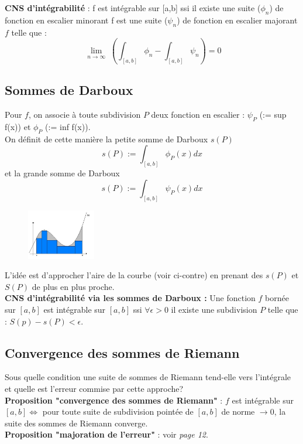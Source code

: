 \documentclass[11pt, a4paper, openany]{book}
\begin{document}
\textbf{CNS d'intégrabilité} : f est intégrable sur [a,b] ssi il existe une suite ($\phi_n$) de fonction en escalier minorant f est une suite ($\psi_n$) de fonction en escalier majorant $f$ telle que : 
$$\lim\limits_{\substack{n \to \infty}} \left(\int_{[a,b]} \phi_n - \int_{[a,b]} \psi_n \right) = 0$$

\subsection{Sommes de Darboux}
Pour $f$, on associe à toute subdivision $P$ deux fonction en escalier : $\psi_P$ (:= sup f(x)) et $\phi_P$ (:= inf f(x)).\\
On définit de cette manière la petite somme de Darboux $s(P)$
$$s(P) := \int_{[a,b]} \phi_P(x) dx$$
et la grande somme de Darboux
$$s(P) := \int_{[a,b]} \psi_P(x) dx$$
\begin{figure}
	\includegraphics[width=3cm]{image2.jpg}
\end{figure}
L'idée est d'approcher l'aire de la courbe (voir ci-contre) en prenant des $s(P)$ et $S(P)$ de plus en plus proche.\\

\textbf{CNS d'intégrabilité via les sommes de Darboux :} Une fonction $f$ bornée sur $[a,b]$ est intégrable sur $[a,b]$ ssi $\forall \epsilon > 0$ il existe une subdivision $P$ telle que : $S(p) - s(P) < \epsilon$.

\subsection{Convergence des sommes de Riemann}
Sous quelle condition une suite de sommes de Riemann tend-elle vers l'intégrale et quelle est l'erreur commise par cette approche?\\

\textbf{Proposition "convergence des sommes de Riemann"} : $f$ est intégrable sur $[a,b] \Leftrightarrow$ pour toute suite de subdivision pointée de $[a,b]$ de norme $\rightarrow 0$, la suite des sommes de Riemann converge.\\

\textbf{Proposition "majoration de l'erreur"} : voir \textit{page 12}.
\end{document}
